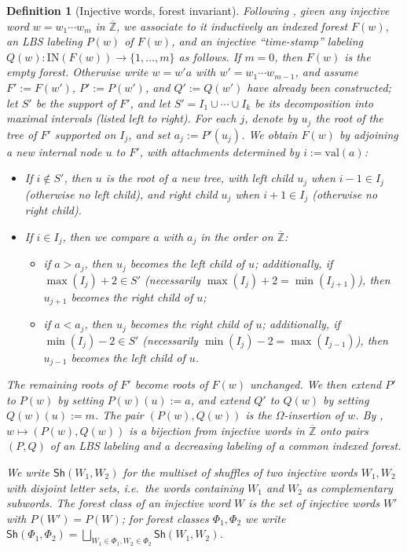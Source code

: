 \documentclass[pdflatex,sn-mathphys-num]{sn-jnl}
\numberwithin{equation}{subsection}
\theoremstyle{thmstyleone}
\theoremstyle{thmstylethree}
\newtheorem{definition}[lemma]{Definition}
\theoremstyle{thmstyletwo}
\begin{document}
\begin{definition}[Injective words, forest invariant]
Following \cite{nadeau2024forest}, given any injective word $w = w_1\cdots w_m$ in $\overline{\mathbb{Z}}$, we associate to it inductively an indexed forest $F(w)$, an LBS labeling $P(w)$ of $F(w)$, and an injective ``time-stamp'' labeling $Q(w):\mathrm{IN}(F(w))\to\{1,\ldots,m\}$ as follows. If $m=0$, then $F(w)$ is the empty forest. Otherwise write $w = w'a$ with $w' = w_1\cdots w_{m-1}$, and assume $F' := F(w')$, $P' := P(w')$, and $Q' := Q(w')$ have already been constructed; let $S'$ be the support of $F'$, and let $S' = I_1\cup\cdots\cup I_k$ be its decomposition into maximal intervals (listed left to right). For each $j$, denote by $u_j$ the root of the tree of $F'$ supported on $I_j$, and set $a_j := P'(u_j)$. We obtain $F(w)$ by adjoining a new internal node $u$ to $F'$, with attachments determined by $i := \mathrm{val}(a)$:
\begin{itemize}
\item If $i\notin S'$, then $u$ is the root of a new tree, with left child $u_j$ when $i-1\in I_j$ (otherwise no left child), and right child $u_j$ when $i+1\in I_j$ (otherwise no right child).
\item If $i\in I_j$, then we compare $a$ with $a_j$ in the order on $\overline{\mathbb{Z}}$:
\begin{itemize}
\item if $a>a_j$, then $u_j$ becomes the left child of $u$; additionally, if $\max(I_j)+2\in S'$ (necessarily $\max(I_j)+2 = \min(I_{j+1})$), then $u_{j+1}$ becomes the right child of $u$;
\item if $a<a_j$, then $u_j$ becomes the right child of $u$; additionally, if $\min(I_j)-2\in S'$ (necessarily $\min(I_j)-2=\max(I_{j-1})$), then $u_{j-1}$ becomes the left child of $u$.
\end{itemize}
\end{itemize}
The remaining roots of $F'$ become roots of $F(w)$ unchanged. We then extend $P'$ to $P(w)$ by setting $P(w)(u) := a$, and extend $Q'$ to $Q(w)$ by setting $Q(w)(u) := m$. The pair $(P(w), Q(w))$ is the \emph{$\Omega$-insertion} of $w$. By \cite[Theorem~5.1]{nadeau2024forest}, $w\mapsto(P(w),Q(w))$ is a bijection from injective words in $\overline{\mathbb{Z}}$ onto pairs $(P,Q)$ of an LBS labeling and a decreasing labeling of a common indexed forest.

We write $\mathsf{Sh}(W_1,W_2)$ for the multiset of \emph{shuffles} of two injective words $W_1,W_2$ with disjoint letter sets, i.e.\ the words containing $W_1$ and $W_2$ as complementary subwords. The \emph{forest class} of an injective word $W$ is the set of injective words $W'$ with $P(W')=P(W)$; for forest classes $\Phi_1,\Phi_2$ we write $\mathsf{Sh}(\Phi_1,\Phi_2)=\bigsqcup_{W_1\in\Phi_1,W_2\in\Phi_2}\mathsf{Sh}(W_1,W_2)$.
\end{definition}
\end{document}

